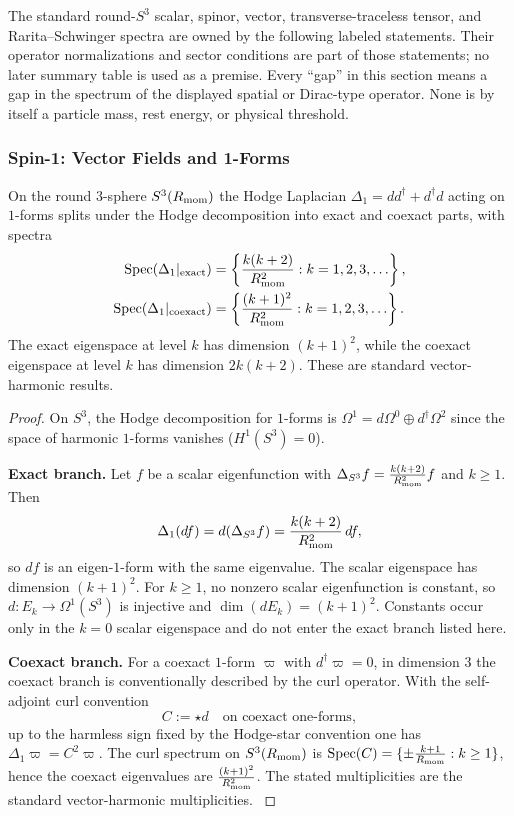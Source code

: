 \documentclass[12pt,a4paper]{article}
\begin{document}
The standard round-\(S^3\) scalar, spinor, vector,
transverse-traceless tensor, and Rarita--Schwinger spectra are owned by the
following labeled statements.  Their operator normalizations and sector
conditions are part of those statements; no later summary table is used as a
premise.  Every ``gap'' in this section means a gap in the spectrum of the
displayed spatial or Dirac-type operator.  None is by itself a particle mass,
rest energy, or physical threshold.

\subsubsection{Spin-1: Vector Fields and 1-Forms}

\begin{theorem}
\label{p2:thm:spin1-spectrum}
On the round 3-sphere $S^3(R_{\mathrm{mom}})$ the Hodge Laplacian $\Delta_1 = d d^\dagger + d^\dagger d$ acting on $1$-forms splits under the Hodge decomposition into exact and coexact parts, with spectra
\begin{align}
\mathrm{Spec}(\Delta_1|_{\mathrm{exact}}) &= \left\{ \frac{k(k+2)}{R_{\mathrm{mom}}^2} : k = 1, 2, 3, \ldots \right\},\\
\mathrm{Spec}(\Delta_1|_{\mathrm{coexact}}) &= \left\{ \frac{(k+1)^2}{R_{\mathrm{mom}}^2} : k = 1, 2, 3, \ldots \right\}.
\end{align}
The exact eigenspace at level $k$ has dimension $(k+1)^2$, while the coexact eigenspace at level $k$ has dimension $2k(k+2)$. These are standard vector-harmonic results. \cite{besse1978manifolds,Camporesi1991}
\end{theorem}

\begin{proof}
On $S^3$, the Hodge decomposition for $1$-forms is $\Omega^1 = d\Omega^0 \oplus d^\dagger\Omega^2$ since the space of harmonic $1$-forms vanishes ($H^1(S^3)=0$). 

\textbf{Exact branch.}
Let $f$ be a scalar eigenfunction with $\Delta_{S^3} f = \frac{k(k+2)}{R_{\mathrm{mom}}^2} f$ and $k\ge 1$. Then
\[
\Delta_1(df)=d(\Delta_{S^3} f)=\frac{k(k+2)}{R_{\mathrm{mom}}^2}\,df,
\]
so $df$ is an eigen-$1$-form with the same eigenvalue. The scalar eigenspace has dimension $(k+1)^2$. For $k\ge1$, no nonzero scalar eigenfunction is constant, so $d:E_k\to\Omega^1(S^3)$ is injective and $\dim(dE_k)=(k+1)^2$. Constants occur only in the $k=0$ scalar eigenspace and do not enter the exact branch listed here.

\textbf{Coexact branch.}
For a coexact $1$-form $\varpi$ with $d^\dagger\varpi=0$, in dimension $3$ the coexact branch is conventionally described by the curl operator.  With the self-adjoint curl convention
\[
C:=\star d\quad\text{on coexact one-forms},
\]
up to the harmless sign fixed by the Hodge-star convention one has \(\Delta_1\varpi=C^2\varpi\).  The curl spectrum on $S^3(R_{\mathrm{mom}})$ is $\mathrm{Spec}(C)=\{\pm\frac{k+1}{R_{\mathrm{mom}}}:k\ge 1\}$, hence the coexact eigenvalues are $\frac{(k+1)^2}{R_{\mathrm{mom}}^2}$. The stated multiplicities are the standard vector-harmonic multiplicities. \cite{Camporesi1991,besse1978manifolds}
\end{proof}
\end{document}
